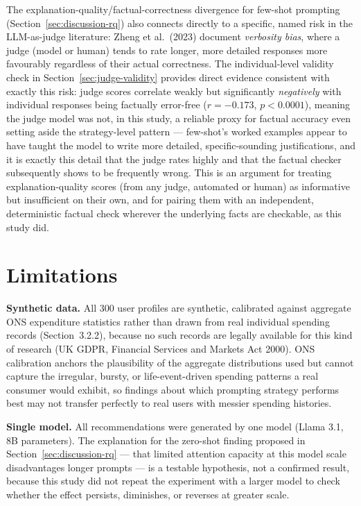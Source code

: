 The explanation-quality/factual-correctness divergence for few-shot prompting (Section~\ref{sec:discussion-rq}) also connects directly to a specific, named risk in the LLM-as-judge literature: Zheng et al.\ (2023) document \textit{verbosity bias}, where a judge (model or human) tends to rate longer, more detailed responses more favourably regardless of their actual correctness. The individual-level validity check in Section~\ref{sec:judge-validity} provides direct evidence consistent with exactly this risk: judge scores correlate weakly but significantly \textit{negatively} with individual responses being factually error-free ($r = -0.173$, $p < 0.0001$), meaning the judge model was not, in this study, a reliable proxy for factual accuracy even setting aside the strategy-level pattern --- few-shot's worked examples appear to have taught the model to write more detailed, specific-sounding justifications, and it is exactly this detail that the judge rates highly and that the factual checker subsequently shows to be frequently wrong. This is an argument for treating explanation-quality scores (from any judge, automated or human) as informative but insufficient on their own, and for pairing them with an independent, deterministic factual check wherever the underlying facts are checkable, as this study did.

\section{Limitations}
\label{sec:limitations-discussion}

\textbf{Synthetic data.} All 300 user profiles are synthetic, calibrated against aggregate ONS expenditure statistics rather than drawn from real individual spending records (Section~3.2.2), because no such records are legally available for this kind of research (UK GDPR, Financial Services and Markets Act 2000). ONS calibration anchors the plausibility of the aggregate distributions used but cannot capture the irregular, bursty, or life-event-driven spending patterns a real consumer would exhibit, so findings about which prompting strategy performs best may not transfer perfectly to real users with messier spending histories.

\textbf{Single model.} All recommendations were generated by one model (Llama 3.1, 8B parameters). The explanation for the zero-shot finding proposed in Section~\ref{sec:discussion-rq} --- that limited attention capacity at this model scale disadvantages longer prompts --- is a testable hypothesis, not a confirmed result, because this study did not repeat the experiment with a larger model to check whether the effect persists, diminishes, or reverses at greater scale.

